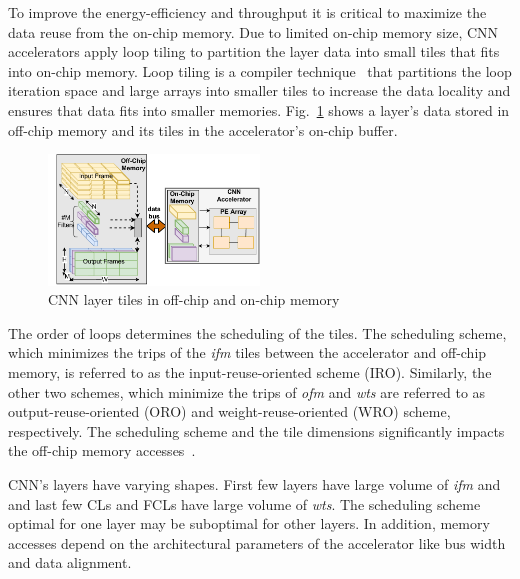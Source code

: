 \documentclass[a4paper,10pt]{article}
\begin{document}
To improve the energy-efficiency and throughput it is critical to maximize the data reuse from the on-chip memory.  Due to limited on-chip memory size, CNN accelerators apply loop tiling to partition the layer data into small tiles that fits into on-chip memory. Loop tiling is a compiler  technique~\cite{aho2006compilers} that partitions the loop iteration space and large arrays into smaller tiles to increase the data locality and ensures that data fits into smaller memories. 
Fig.~\ref{fig:partitioningDataUsingTiling} shows a layer's data stored in off-chip memory and its tiles in the accelerator's on-chip buffer.
\begin{figure}[!htb]
	\centering
    \captionsetup{font=sf}	
	\includegraphics[width=0.5\textwidth]{images/AboutTheCNNTiles.pdf}
	\caption{CNN layer tiles in off-chip and on-chip memory}
	\label{fig:partitioningDataUsingTiling}
\end{figure}
 The order of loops determines the scheduling of the tiles. The scheduling scheme, which minimizes the trips of the \textit{ifm} tiles between the accelerator and off-chip memory, is referred to as the input-reuse-oriented scheme (IRO). Similarly, the other two schemes, which minimize the trips of \textit{ofm} and \textit{wts} are referred to as output-reuse-oriented (ORO) and weight-reuse-oriented (WRO) scheme, respectively. The scheduling scheme and the tile dimensions significantly impacts the off-chip memory accesses~\cite{zhang2015optimizing, Li2018SmartShuttleOO}. 
   
CNN's layers have varying shapes. First few layers have large volume of \textit{ifm} and  and last few CLs and FCLs have large volume of \textit{wts}. The scheduling scheme optimal for one layer may be suboptimal for other layers. In addition, memory accesses depend on the architectural parameters of the accelerator like bus width and data alignment. 
\end{document}
